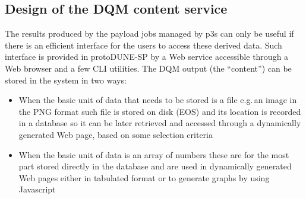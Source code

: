 \documentclass{webofc}
\newcommand{\pd}{protoDUNE\xspace}
\begin{document}


\subsection{Design of the DQM content service}
The results produced by the payload jobs managed by p3s can only be useful if there is an
efficient interface for the users to access these derived data. Such interface is provided in \pd-SP
by a Web service accessible through a Web browser and a few CLI utilities.
The DQM output (the ``content'') can be stored in the system in two ways:
\begin{itemize}

\item When the basic unit of data that needs to be stored is a file e.g.\,an image in the PNG format such
file is stored on disk (EOS) and its location is recorded in a database so it can be later retrieved
and accessed through a dynamically generated Web page,  based on some selection criteria

\item When the basic unit of data is an array of numbers these are for the most part stored directly
in the database and are used in dynamically generated Web pages either in tabulated format or
to generate graphs by using Javascript

\end{itemize}
\end{document}
